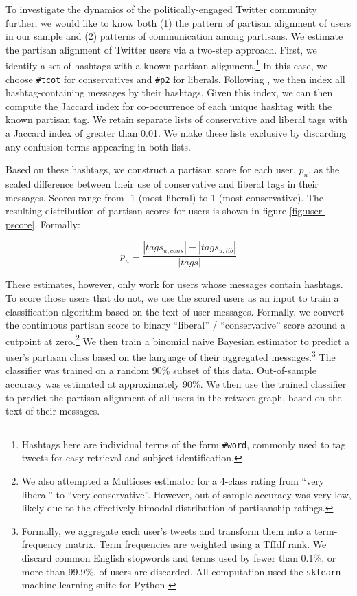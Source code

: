 \documentclass[11pt]{article}
\begin{document}
To investigate the dynamics of the politically-engaged Twitter
community further, we would like to know both (1) the pattern of
partisan alignment of users in our sample and (2) patterns of
communication among partisans. We estimate the partisan alignment of
Twitter users via a two-step approach. First, we identify a set of
hashtags with a known partisan alignment.\footnote{Hashtags here are
  individual terms of the form \texttt{\#word}, commonly used to tag
  tweets for easy retrieval and subject identification.} In this case,
we choose \texttt{\#tcot} for conservatives and \texttt{\#p2} for
liberals. Following \cite{conover2011}, we then index all
hashtag-containing messages by their hashtags. Given this index, we
can then compute the Jaccard index for co-occurrence of each unique
hashtag with the known partisan tag. We retain separate lists of
conservative and liberal tags with a Jaccard
index of greater than 0.01. We make these lists exclusive by
discarding any confusion terms appearing in both lists.

Based on these hashtags, we construct a partisan score for each user,
$p_u$, as the scaled difference between their use of conservative and
liberal tags in their messages. Scores range from -1 (most liberal) to 1 (most conservative). The resulting distribution of partisan scores for users is shown in
figure \ref{fig:user-pscore}. Formally:

 \begin{equation}
   \label{eq:pscore}
   p_u = \frac{\left|tags_{u,cons}\right| - \left|tags_{u, lib}\right|}{\left|tags\right|}
 \end{equation}

These estimates, however, only work for users whose messages contain
hashtags. To score those users that do not,
we use the scored users as an input to train a classification
algorithm based on the text of user messages. Formally, we convert the
continuous partisan score to binary ``liberal'' / ``conservative''
score around a cutpoint at zero.\footnote{We also attempted a
Multicses estimator for a 4-class rating from ``very liberal'' to
``very conservative''. However, out-of-sample accuracy was very low,
likely due to the effectively bimodal distribution of partisanship
ratings.} We then train a binomial naive Bayesian estimator to predict
a user's partisan class based on the language of their aggregated
messages.\footnote{Formally, we aggregate each user's tweets and
transform them into a term-frequency matrix. Term frequencies are
weighted using a TfIdf rank. We discard common English stopwords and terms used by fewer than 0.1\%, or more
than 99.9\%, of users are discarded. All computation used the
\texttt{sklearn} machine learning suite for
Python \cite{scikit-learn}} The classifier was trained on a
random 90\% subset of this data. Out-of-sample accuracy was estimated
at approximately 90\%. We then use the trained classifier to predict
the partisan alignment of all users in the retweet graph, based on the
text of their messages.
\end{document}
